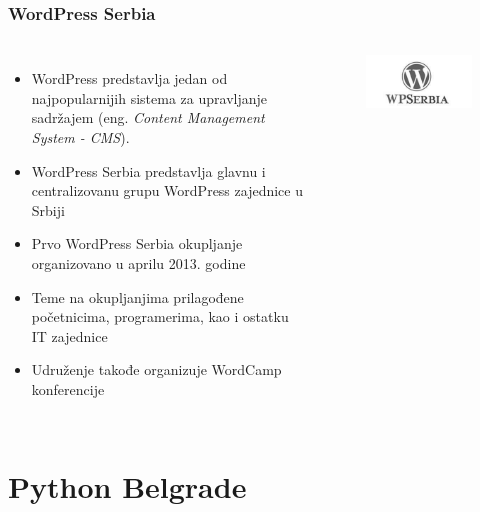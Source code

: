 \documentclass[hyperref={bookmarks=false},aspectratio=169]{beamer}
\begin{document}
\begin{frame}
\frametitle{WordPress Serbia}

\begin{columns}[T]

\begin{itemize}
    \item WordPress predstavlja jedan od najpopularnijih sistema za upravljanje sadržajem (eng. \emph{Content Management System - CMS}).
    \item WordPress Serbia predstavlja glavnu i centralizovanu grupu WordPress zajednice u Srbiji
    \item Prvo WordPress Serbia okupljanje organizovano u aprilu 2013. godine
    \item Teme na okupljanjima prilagođene početnicima, programerima, kao i ostatku IT zajednice
    \item Udruženje takođe organizuje WordCamp konferencije
\end{itemize}



\begin{figure}
    \raggedleft
    \includegraphics[scale=0.4]{./images/wp.jpg}
\end{figure}

\end{columns}
\end{frame}

\section{Python Belgrade}
\end{document}
